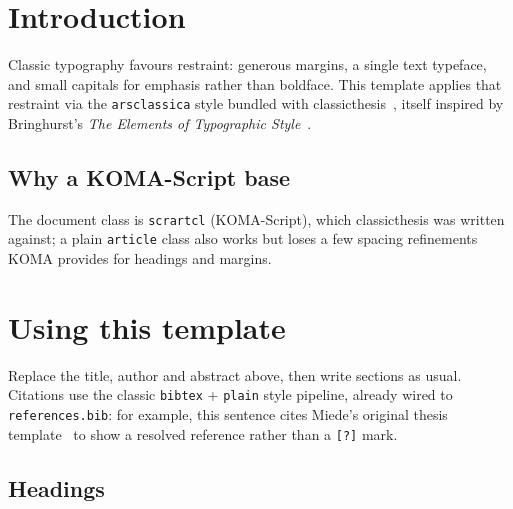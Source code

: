 \documentclass[11pt,a4paper]{scrartcl} %
\title{\rmfamily\normalfont\spacedallcaps{A Note on Typographic Restraint}}
\author{\spacedlowsmallcaps{Jane Researcher}}
\date{\today}
\begin{document}
\pagestyle{plain}
\maketitle

\begin{abstract}
    \noindent This article demonstrates the \emph{arsclassica} styling of the
    \texttt{classicthesis} package: small-caps headings, a restrained rule
    under the title, and Palatino-metric body text. It is meant as a starting
    point for a short paper or article-length piece of writing, not a full
    thesis.
\end{abstract}

\tableofcontents

\section{Introduction}
\label{sec:introduction}

Classic typography favours restraint: generous margins, a single text
typeface, and small capitals for emphasis rather than boldface. This
template applies that restraint via the \texttt{arsclassica} style bundled
with classicthesis~\cite{classicthesis}, itself inspired by Bringhurst's
\emph{The Elements of Typographic Style}~\cite{bringhurst2004}.

\subsection{Why a KOMA-Script base}
\label{sec:koma}

The document class is \texttt{scrartcl} (KOMA-Script), which classicthesis
was written against; a plain \texttt{article} class also works but loses a
few spacing refinements KOMA provides for headings and margins.

\section{Using this template}
\label{sec:usage}

Replace the title, author and abstract above, then write sections as usual.
Citations use the classic \texttt{bibtex} + \texttt{plain} style pipeline,
already wired to \texttt{references.bib}: for example, this sentence cites
Miede's original thesis template~\cite{miede2012} to show a resolved
reference rather than a \texttt{[?]} mark.

\subsection{Headings}
\end{document}
